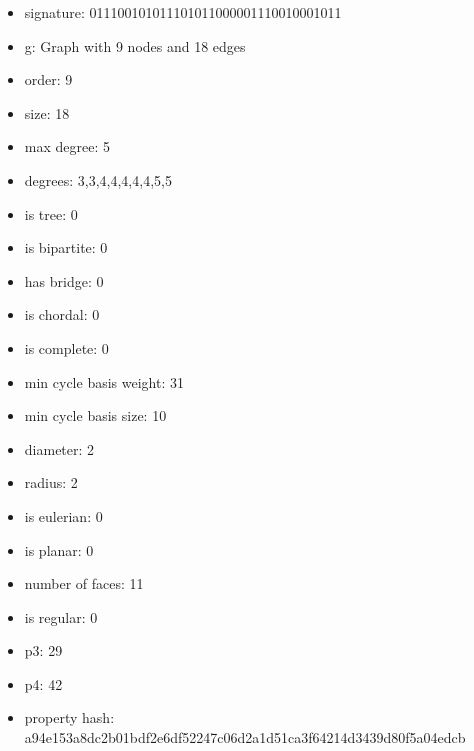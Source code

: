\newpage
\begin{figure}
\end{figure}
\begin{itemize}
\item signature: 011100101011101011000001110010001011
\item g: Graph with 9 nodes and 18 edges
\item order: 9
\item size: 18
\item max degree: 5
\item degrees: 3,3,4,4,4,4,4,5,5
\item is tree: 0
\item is bipartite: 0
\item has bridge: 0
\item is chordal: 0
\item is complete: 0
\item min cycle basis weight: 31
\item min cycle basis size: 10
\item diameter: 2
\item radius: 2
\item is eulerian: 0
\item is planar: 0
\item number of faces: 11
\item is regular: 0
\item p3: 29
\item p4: 42
\item property hash: a94e153a8dc2b01bdf2e6df52247c06d2a1d51ca3f64214d3439d80f5a04edcb
\end{itemize}
